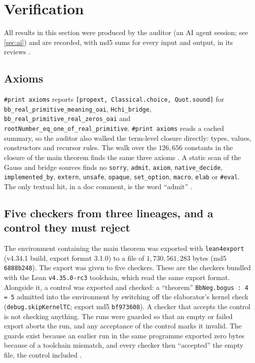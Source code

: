 \documentclass[11pt]{article}
\theoremstyle{definition}
\newcommand{\lean}[1]{\texttt{#1}}
\begin{document}
\section{Verification}\label{sec:verification}

All results in this section were produced by the auditor (an AI agent session; see \cref{sec:ai}) and are recorded, with md5 sums for every input and output, in its reviews \cite{bbrecords}.

\subsection{Axioms}

\lean{\#print axioms} reports \lean{[propext, Classical.choice, Quot.sound]} for \lean{bb\_\allowbreak{}real\_\allowbreak{}primitive\_\allowbreak{}meaning\_\allowbreak{}oai}, \lean{Hchi\_\allowbreak{}bridge}, \lean{bb\_\allowbreak{}real\_\allowbreak{}primitive\_\allowbreak{}real\_\allowbreak{}zeros\_\allowbreak{}oai} and \lean{rootNumber\_\allowbreak{}eq\_\allowbreak{}one\_\allowbreak{}of\_\allowbreak{}real\_\allowbreak{}primitive}. \lean{\#print axioms} reads a cached summary, so the auditor also walked the term-level closure directly: types, values, constructors and recursor rules. The walk over the $126{,}656$ constants in the closure of the main theorem finds the same three axioms \cite[ADD1 \S3]{bbrecords}. A static scan of the Gauss and bridge sources finds no \lean{sorry}, \lean{admit}, \lean{axiom}, \lean{native\_\allowbreak{}decide}, \lean{implemented\_\allowbreak{}by}, \lean{extern}, \lean{unsafe}, \lean{opaque}, \lean{set\_\allowbreak{}option}, \lean{macro}, \lean{elab} or \lean{\#eval}. The only textual hit, in a doc comment, is the word ``admit'' \cite[\S A.2; ADD1 \S1]{bbrecords}.

\subsection{Five checkers from three lineages, and a control they must reject}

The environment containing the main theorem was exported with \lean{lean4export} \cite{lean4export} (v4.34.1 build, export format 3.1.0) to a file of $1{,}730{,}561{,}283$ bytes (md5 \lean{6888b248}). The export was given to five checkers. These are the checkers bundled with the Lean \lean{v4.35.0-rc3} toolchain, which read the same export format. Alongside it, a control was exported and checked: a ``theorem'' \lean{BbNeg.bogus : 4 = 5} admitted into the environment by switching off the elaborator's kernel check (\lean{debug.skipKernelTC}; export md5 \lean{bf973608}). A checker that accepts the control is not checking anything. The runs were guarded so that an empty or failed export aborts the run, and any acceptance of the control marks it invalid. The guards exist because an earlier run in the same programme exported zero bytes because of a toolchain mismatch, and every checker then ``accepted'' the empty file, the control included \cite[REVIEW\_CTFREE\_KERNELS]{bbrecords}.
\end{document}

